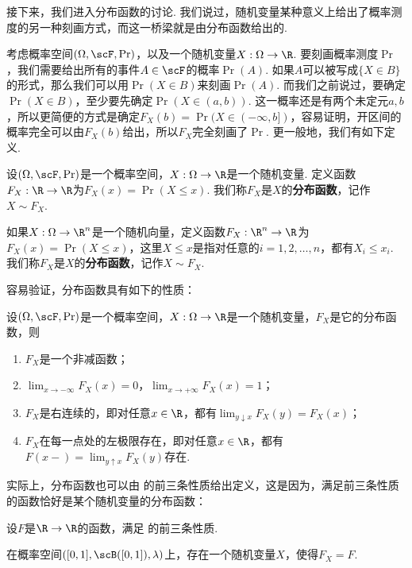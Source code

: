 接下来，我们进入分布函数的讨论. 我们说过，随机变量某种意义上给出了概率测度的另一种刻画方式，而这一桥梁就是由分布函数给出的. 

考虑概率空间$(\Omega,\scF,\Pr)$，以及一个随机变量$X:\Omega\to\R$. 要刻画概率测度$\Pr$，我们需要给出所有的事件$A\in\scF$的概率$\Pr(A)$. 如果$A$可以被写成$\{X\in B\}$的形式，那么我们可以用$\Pr(X\in B)$来刻画$\Pr(A)$. 而我们之前说过，要确定$\Pr(X\in B)$，至少要先确定$\Pr(X\in(a,b))$. 这一概率还是有两个未定元$a,b$，所以更简便的方式是确定$F_X(b)=\Pr(X\in(-\infty,b])$，容易证明，开区间的概率完全可以由$F_X(b)$给出，所以$F_X$完全刻画了$\Pr$. 更一般地，我们有如下定义. 

\begin{definition}[分布函数]
设$(\Omega,\scF,\Pr)$是一个概率空间，$X:\Omega\to\R$是一个随机变量. 定义函数$F_X:\R\to\R$为$F_X(x) = \Pr(X\leq x)$. 我们称$F_X$是$X$的\textbf{分布函数}，记作$X\sim F_X$.

如果$X:\Omega\to\R^n$是一个随机向量，定义函数$F_X:\R^n\to\R$为$F_X(x) = \Pr(X\leq x)$，这里$X\leq x$是指对任意的$i=1,2,\ldots,n$，都有$X_i\leq x_i$. 我们称$F_X$是$X$的\textbf{分布函数}，记作$X\sim F_X$.
\end{definition}

容易验证，分布函数具有如下的性质：

\begin{proposition}\label{prop:distribution-function}
设$(\Omega,\scF,\Pr)$是一个概率空间，$X:\Omega\to\R$是一个随机变量，$F_X$是它的分布函数，则
\begin{enumerate}
    \item $F_X$是一个非减函数；
    \item $\lim_{x\to-\infty}F_X(x)=0$，$\lim_{x\to+\infty}F_X(x)=1$；
    \item $F_X$是右连续的，即对任意$x\in\R$，都有$\lim_{y\downarrow x}F_X(y)=F_X(x)$；
    \item $F_X$在每一点处的左极限存在，即对任意$x\in\R$，都有$F(x-)=\lim_{y\uparrow x}F_X(y)$存在.
\end{enumerate}
\end{proposition}

实际上，分布函数也可以由 的前三条性质给出定义，这是因为，满足前三条性质的函数恰好是某个随机变量的分布函数：

\begin{theorem}\label{thm:distribution-function}
设$F$是$\R\to\R$的函数，满足 的前三条性质. 

在概率空间$([0,1],\scB([0,1]),\lambda)$上，存在一个随机变量$X$，使得$F_X=F$.
\end{theorem}

